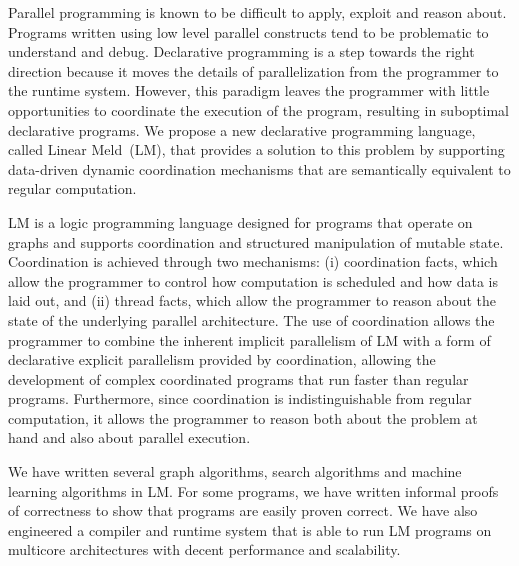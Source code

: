 Parallel programming is known to be difficult to apply, exploit and reason
about. Programs written using low level parallel constructs tend to be
problematic to understand and debug. Declarative programming is a step towards
the right direction because it moves the details of parallelization from the
programmer to the runtime system. However, this paradigm leaves the programmer
with little opportunities to coordinate the execution of the program, resulting
in suboptimal declarative programs.  We propose a new declarative programming
language, called Linear Meld~(LM), that provides a solution to this problem by
supporting data-driven dynamic coordination mechanisms that are semantically
equivalent to regular computation.

LM is a logic programming language designed for programs that operate on graphs
and supports coordination and structured manipulation of mutable state.
Coordination is achieved through two mechanisms: (i) coordination facts, which
allow the programmer to control how computation is scheduled and how data is
laid out, and (ii) thread facts, which allow the programmer to reason about the
state of the underlying parallel architecture.  The use of coordination allows the
programmer to combine the inherent implicit parallelism of LM with a form of
declarative explicit parallelism provided by coordination, allowing the
development of complex coordinated programs that run faster than regular
programs. Furthermore, since coordination is indistinguishable from regular
computation, it allows the programmer to reason both about the problem at hand
and also about parallel execution.

We have written several graph algorithms, search algorithms and machine learning
algorithms in LM. For some programs, we have written informal proofs of
correctness to show that programs are easily proven correct. We have also
engineered a compiler and runtime system that is able to run LM programs on
multicore architectures with decent performance and scalability.
